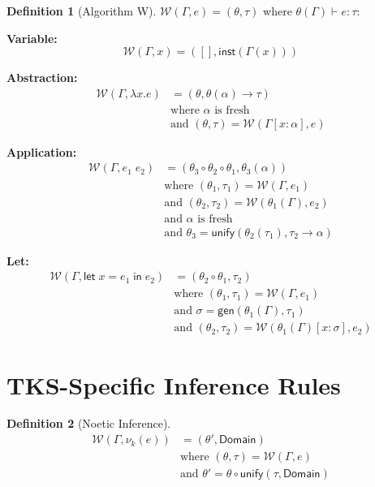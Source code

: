 \documentclass[11pt,twoside,openright]{book}
\theoremstyle{definition}
\newtheorem{definition}{Definition}[chapter]
\theoremstyle{plain}
\theoremstyle{remark}
\newcommand{\noe}[1]{\nu_{#1}}
\newcommand{\TypeScheme}{\sigma}             %
\newcommand{\Subst}{\theta}                  %
\newcommand{\Unify}{\mathsf{unify}}          %
\newcommand{\Inst}{\mathsf{inst}}            %
\newcommand{\Gen}{\mathsf{gen}}              %
\newcommand{\AlgW}{\mathcal{W}}              %
\begin{document}
\begin{definition}[Algorithm W]
\label{def:algorithm-w}
$\AlgW(\Gamma, e) = (\Subst, \tau)$ where $\Subst(\Gamma) \vdash e : \tau$:

\textbf{Variable:}
\[
\AlgW(\Gamma, x) = ([], \Inst(\Gamma(x)))
\]

\textbf{Abstraction:}
\begin{align}
\AlgW(\Gamma, \lambda x. e) &= (\Subst, \Subst(\alpha) \to \tau) \\
  &\text{where } \alpha \text{ is fresh} \\
  &\text{and } (\Subst, \tau) = \AlgW(\Gamma[x : \alpha], e)
\end{align}

\textbf{Application:}
\begin{align}
\AlgW(\Gamma, e_1\; e_2) &= (\Subst_3 \circ \Subst_2 \circ \Subst_1, \Subst_3(\alpha)) \\
  &\text{where } (\Subst_1, \tau_1) = \AlgW(\Gamma, e_1) \\
  &\text{and } (\Subst_2, \tau_2) = \AlgW(\Subst_1(\Gamma), e_2) \\
  &\text{and } \alpha \text{ is fresh} \\
  &\text{and } \Subst_3 = \Unify(\Subst_2(\tau_1), \tau_2 \to \alpha)
\end{align}

\textbf{Let:}
\begin{align}
\AlgW(\Gamma, \mathsf{let}\; x = e_1 \;\mathsf{in}\; e_2) &= (\Subst_2 \circ \Subst_1, \tau_2) \\
  &\text{where } (\Subst_1, \tau_1) = \AlgW(\Gamma, e_1) \\
  &\text{and } \TypeScheme = \Gen(\Subst_1(\Gamma), \tau_1) \\
  &\text{and } (\Subst_2, \tau_2) = \AlgW(\Subst_1(\Gamma)[x : \TypeScheme], e_2)
\end{align}
\end{definition}

\section{TKS-Specific Inference Rules}

\begin{definition}[Noetic Inference]
\label{def:noetic-inference}
\begin{align}
\AlgW(\Gamma, \noe{k}(e)) &= (\Subst', \mathsf{Domain}) \\
  &\text{where } (\Subst, \tau) = \AlgW(\Gamma, e) \\
  &\text{and } \Subst' = \Subst \circ \Unify(\tau, \mathsf{Domain})
\end{align}
\end{definition}
\end{document}
